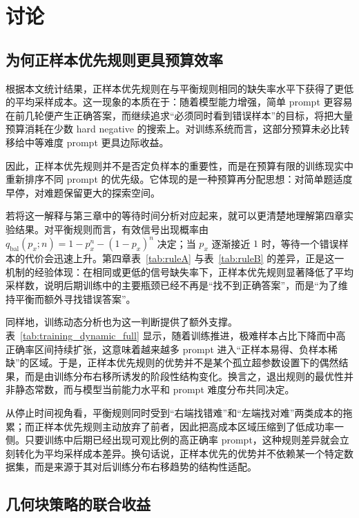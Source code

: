\chapter{讨论}\label{chap:discussion}

\section{为何正样本优先规则更具预算效率}

根据本文统计结果，正样本优先规则在与平衡规则相同的缺失率水平下获得了更低的平均采样成本。这一现象的本质在于：随着模型能力增强，简单 prompt 更容易在前几轮便产生正确答案，而继续追求“必须同时看到错误样本”的目标，将把大量预算消耗在少数 hard negative 的搜索上。对训练系统而言，这部分预算未必比转移给中等难度 prompt 更具边际收益。

因此，正样本优先规则并不是否定负样本的重要性，而是在预算有限的训练现实中重新排序不同 prompt 的优先级。它体现的是一种预算再分配思想：对简单题适度早停，对难题保留更大的探索空间。

若将这一解释与第三章中的等待时间分析对应起来，就可以更清楚地理解第四章实验结果。对平衡规则而言，有效信号出现概率由 $q_{\mathrm{bal}}(p_x;n)=1-p_x^n-(1-p_x)^n$ 决定；当 $p_x$ 逐渐接近 $1$ 时，等待一个错误样本的代价会迅速上升。第四章表~\ref{tab:ruleA} 与表~\ref{tab:ruleB} 的差异，正是这一机制的经验体现：在相同或更低的信号缺失率下，正样本优先规则显著降低了平均采样数，说明后期训练中的主要瓶颈已经不再是“找不到正确答案”，而是“为了维持平衡而额外寻找错误答案”。

同样地，训练动态分析也为这一判断提供了额外支撑。表~\ref{tab:training_dynamic_full} 显示，随着训练推进，极难样本占比下降而中高正确率区间持续扩张，这意味着越来越多 prompt 进入“正样本易得、负样本稀缺”的区域。于是，正样本优先规则的优势并不是某个孤立超参数设置下的偶然结果，而是由训练分布右移所诱发的阶段性结构变化。换言之，退出规则的最优性并非静态常数，而与模型当前能力水平和 prompt 难度分布共同决定。

从停止时间视角看，平衡规则同时受到“右端找错难”和“左端找对难”两类成本的拖累；而正样本优先规则主动放弃了前者，因此把高成本区域压缩到了低成功率一侧。只要训练中后期已经出现可观比例的高正确率 prompt，这种规则差异就会立刻转化为平均采样成本差异。换句话说，正样本优先的优势并不依赖某一个特定数据集，而是来源于其对后训练分布右移趋势的结构性适配。

\section{几何块策略的联合收益}

